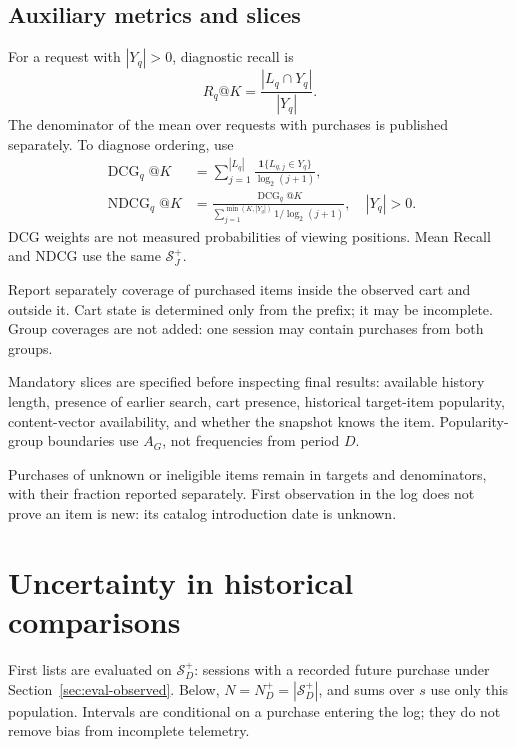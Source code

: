 \documentclass[12pt,a4paper]{article}
\newcommand{\ind}{\mathbf 1}
\theoremstyle{plainru}
\begin{document}
\subsection{Auxiliary metrics and slices}
\label{sec:eval-diagnostics}

For a request with $|Y_q|>0$, diagnostic recall is
\begin{equation}\label{eq:eval-request-recall}
 R_q@K=\frac{|L_q\cap Y_q|}{|Y_q|}.
\end{equation}
The denominator of the mean over requests with purchases is published separately.
To diagnose ordering, use
\begin{align}
 \operatorname{DCG}_q@K
 &=\sum_{j=1}^{|L_q|}
       \frac{\ind\{L_{q,j}\in Y_q\}}{\log_2(j+1)},
 \label{eq:eval-dcg}\\
 \operatorname{NDCG}_q@K
 &=\frac{\operatorname{DCG}_q@K}
 {\displaystyle\sum_{j=1}^{\min(K,|Y_q|)}1/\log_2(j+1)},
 \quad |Y_q|>0.
 \label{eq:eval-ndcg}
\end{align}
DCG weights are not measured probabilities of viewing positions.
Mean Recall and NDCG use the same $\mathcal S_J^+$.

Report separately coverage of purchased items inside the observed cart
and outside it. Cart state is determined only from the prefix;
it may be incomplete. Group coverages are not added: one session
may contain purchases from both groups.

Mandatory slices are specified before inspecting final results:
available history length, presence of earlier search,
cart presence, historical target-item popularity,
content-vector availability, and whether the snapshot knows the item.
Popularity-group boundaries use $A_G$, not frequencies from period $D$.

Purchases of unknown or ineligible items remain in targets
and denominators, with their fraction reported separately. First observation in the log
does not prove an item is new: its catalog introduction date is unknown.

\section{Uncertainty in historical comparisons}
\label{sec:eval-uncertainty}

First lists are evaluated on $\mathcal S_D^+$: sessions with a recorded
future purchase under Section~\ref{sec:eval-observed}. Below, $N=N_D^+=|\mathcal S_D^+|$,
and sums over $s$ use only this population. Intervals are conditional on
a purchase entering the log; they do not remove bias from incomplete telemetry.
\end{document}
